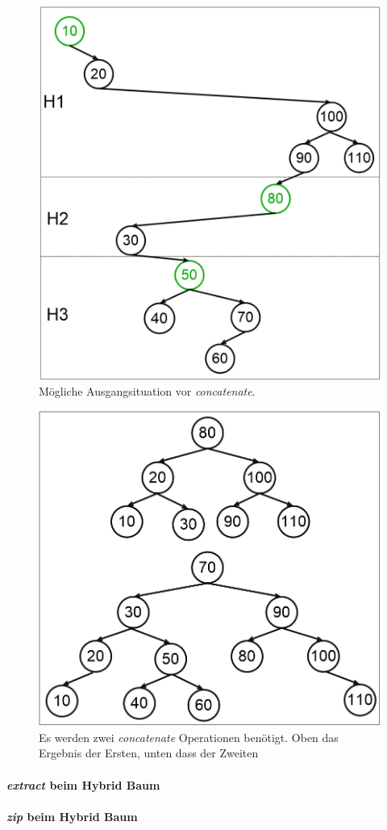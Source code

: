 \documentclass[a4paper,12pt]{article}
\begin{document}
\begin{figure}[h]
	\centering
	\includegraphics[height= 0.5\textwidth]{"Medien/Zipper/hybrid/concatPfad"}
	\caption{Mögliche Ausgangsituation vor \textit{concatenate}.}
	\label{fig:concatPfad}
\end{figure} 
\begin{figure}[h]
	\centering
	\includegraphics[height= 0.5\textwidth]{"Medien/Zipper/hybrid/concatHybrid"}
	\caption{Es werden zwei  \textit{concatenate} Operationen benötigt. Oben das Ergebnis der Ersten, unten dass der Zweiten }
	\label{fig:concatHybrid}
\end{figure} 
\paragraph{\textit{extract} beim Hybrid Baum} 
\paragraph{\textit{zip} beim Hybrid Baum} 
\end{document}
